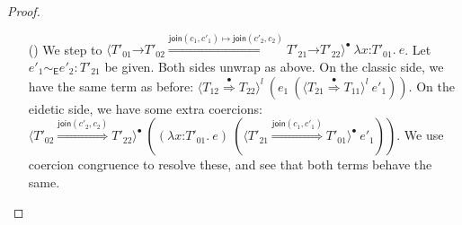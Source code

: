 \documentclass[9pt]{extarticle}
\newcommand{\ottnt}[1]{\mathit{#1}}
\newcommand{\ottsym}[1]{#1}
\begin{document}
\begin{lemma}
\begin{proof}
{\begin{itemize}
\begin{itemize}
        are related and reduce to related results (by expansion via
         and the observation that $ \mathsf{coerce} ( \ottnt{T'_{{\mathrm{21}}}} , \ottnt{T'_{{\mathrm{11}}}} , \ottnt{l} )   \ottsym{=}  \ottnt{c_{{\mathrm{1}}}}$ ). Blame (at the same label!) aborts the computation. If
        the arguments produce values, then we apply our assumption
        that $ \ottnt{e_{{\mathrm{1}}}}   \sim _{  \mathsf{E}  }  \ottnt{e_{{\mathrm{2}}}}  :   \ottnt{T'_{{\mathrm{11}}}} \mathord{ \rightarrow } \ottnt{T'_{{\mathrm{12}}}}  $, so $  \ottnt{e_{{\mathrm{1}}}} ~ \ottnt{e'_{{\mathrm{1}}}}    \simeq _{  \mathsf{E}  }   \ottnt{e_{{\mathrm{2}}}} ~ \ottnt{e'_{{\mathrm{2}}}}   :  \ottnt{T'_{{\mathrm{12}}}} $. Again, blame (at the same label!)  aborts early. A
        value flows to the related codomain casts, and we are done
        by the IH and -expansion (observing
        $ \mathsf{coerce} ( \ottnt{T'_{{\mathrm{12}}}} , \ottnt{T'_{{\mathrm{22}}}} , \ottnt{l} )   \ottsym{=}  \ottnt{c_{{\mathrm{2}}}}$).
      \item[(\ECastMerge)] We step to $ \langle   \ottnt{T'_{{\mathrm{01}}}} \mathord{ \rightarrow } \ottnt{T'_{{\mathrm{02}}}}   \mathord{ \overset{  \mathsf{join} ( \ottnt{c_{{\mathrm{1}}}} , \ottnt{c'_{{\mathrm{1}}}} )   \mapsto   \mathsf{join} ( \ottnt{c'_{{\mathrm{2}}}} , \ottnt{c_{{\mathrm{2}}}} )  }{\Rightarrow} }   \ottnt{T'_{{\mathrm{21}}}} \mathord{ \rightarrow } \ottnt{T'_{{\mathrm{22}}}}   \rangle^{\bullet} ~   \lambda \mathit{x} \mathord{:} \ottnt{T'_{{\mathrm{01}}}} .~  \ottnt{e}  $. Let $ \ottnt{e'_{{\mathrm{1}}}}   \sim _{  \mathsf{E}  }  \ottnt{e'_{{\mathrm{2}}}}  :  \ottnt{T'_{{\mathrm{21}}}} $ be given. Both sides unwrap as above. On the classic
        side, we have the same term as before: $ \langle  \ottnt{T_{{\mathrm{12}}}}  \mathord{ \overset{\bullet}{\Rightarrow} }  \ottnt{T_{{\mathrm{22}}}}  \rangle^{ \ottnt{l} } ~   (  \ottnt{e_{{\mathrm{1}}}} ~  (  \langle  \ottnt{T_{{\mathrm{21}}}}  \mathord{ \overset{\bullet}{\Rightarrow} }  \ottnt{T_{{\mathrm{11}}}}  \rangle^{ \ottnt{l} } ~  \ottnt{e'_{{\mathrm{1}}}}  )   )  $. On the eidetic side, we have some extra
        coercions: $ \langle  \ottnt{T'_{{\mathrm{02}}}}  \mathord{ \overset{  \mathsf{join} ( \ottnt{c'_{{\mathrm{2}}}} , \ottnt{c_{{\mathrm{2}}}} )  }{\Rightarrow} }  \ottnt{T'_{{\mathrm{22}}}}  \rangle^{\bullet} ~   (   (  \lambda \mathit{x} \mathord{:} \ottnt{T'_{{\mathrm{01}}}} .~  \ottnt{e}  )  ~  (  \langle  \ottnt{T'_{{\mathrm{21}}}}  \mathord{ \overset{  \mathsf{join} ( \ottnt{c_{{\mathrm{1}}}} , \ottnt{c'_{{\mathrm{1}}}} )  }{\Rightarrow} }  \ottnt{T'_{{\mathrm{01}}}}  \rangle^{\bullet} ~  \ottnt{e'_{{\mathrm{1}}}}  )   )  $.
We use coercion congruence to resolve these, and see that
        both terms behave the same.


\end{itemize}
\end{itemize}}
\end{proof}
\end{lemma}
\end{document}
